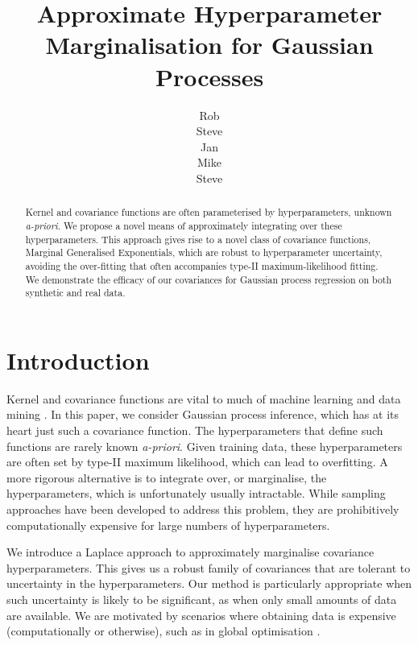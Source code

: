 \documentclass{article}
\title{Approximate Hyperparameter Marginalisation for Gaussian Processes}
\author{
Rob\\
\And
Steve\\
\And
Jan\\
\And
Mike\\
\And
Steve\\}
\begin{document}
\maketitle

\begin{abstract}
Kernel and covariance functions are often parameterised by hyperparameters, unknown {\it a-priori}. We propose a novel means of approximately integrating over these hyperparameters. This approach gives rise to a novel class of covariance functions, Marginal Generalised Exponentials, which are robust to hyperparameter uncertainty, avoiding the over-fitting that often accompanies type-II maximum-likelihood fitting. We demonstrate the efficacy of our covariances for Gaussian process regression on both synthetic and real data.
\end{abstract}


\section{Introduction}

Kernel and covariance functions are vital to much of machine learning and data mining \citep{shawe2004kernel}. In this paper, we consider Gaussian process \citep{rassandwill} inference, which has at its heart just such a covariance function. The hyperparameters that define such functions are rarely known {\it a-priori}. Given training data, these hyperparameters are often set by type-II maximum likelihood, which can lead to overfitting. A more rigorous alternative is to integrate over, or marginalise, the hyperparameters, which is unfortunately usually intractable. While sampling approaches \citep{neal1997monte} have been developed to address this problem, they are prohibitively computationally expensive for large numbers of hyperparameters. 


We introduce a Laplace approach to approximately marginalise covariance hyperparameters. This gives us a robust family of covariances that are tolerant to uncertainty in the hyperparameters. Our method is particularly appropriate when such uncertainty is likely to be significant, as when only small amounts of data are available. We are motivated by scenarios where obtaining data is expensive (computationally or otherwise), such as in global optimisation \citep{osborne2009gaussian,reece11}. 
\end{document}
